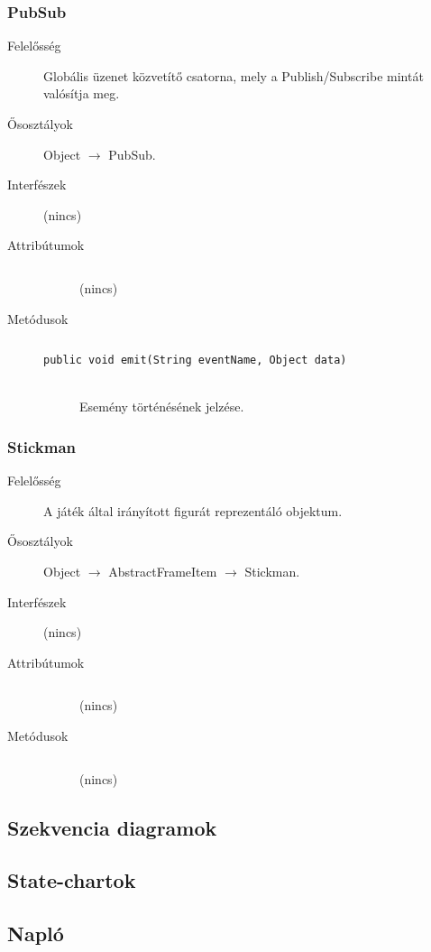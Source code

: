 		\subsubsection{PubSub}
		\begin{description}
		\item[Felelősség]
		Globális üzenet közvetítő csatorna, mely a Publish/Subscribe mintát valósítja meg.
		\item[Ősosztályok] Object $\rightarrow{}$ PubSub.
		\item[Interfészek] (nincs)
		\item[Attribútumok]$\ $
		\begin{description}
		\item[] (nincs)
		\end{description}
		\item[Metódusok]$\ $
		\begin{description}
			\item[\texttt{public void emit(String eventName, Object data)}] \hfill \\Esemény történésének jelzése.
		\end{description}
		\end{description}
		
		\subsubsection{Stickman}
		\begin{description}
		\item[Felelősség]
		A játék által irányított figurát reprezentáló objektum.
		\item[Ősosztályok] Object $\rightarrow{}$ AbstractFrameItem $\rightarrow{}$ Stickman.
		\item[Interfészek] (nincs)
		\item[Attribútumok]$\ $
		\begin{description}
		\item[] (nincs)
		\end{description}
		\item[Metódusok]$\ $
		\begin{description}
		\item[] (nincs)
		\end{description}
		\end{description}
	
	\subsection{Szekvencia diagramok}
	
	\subsection{State-chartok}
	
	\subsection{Napló}

